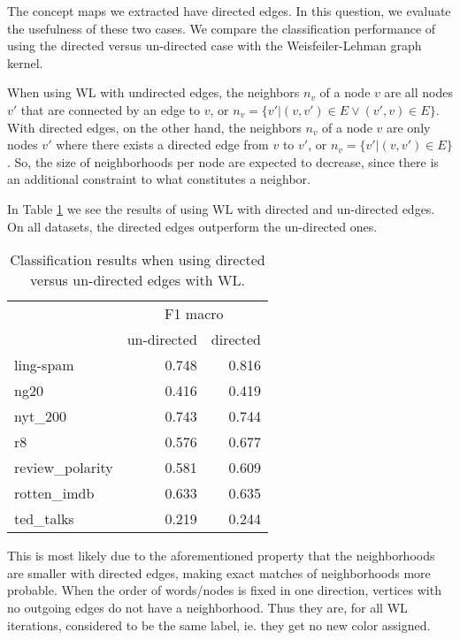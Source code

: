 The concept maps we extracted have directed edges.
In this question, we evaluate the usefulness of these two cases.
We compare the classification performance of using the directed versus un-directed case with the Weisfeiler-Lehman graph kernel.

When using WL with undirected edges, the neighbors $n_v$ of a node $v$ are all nodes $v'$ that are connected by an edge to $v$, or $n_v = \{v' | (v, v') \in E \lor (v', v ) \in E \}$.
With directed edges, on the other hand, the neighbors $n_v$ of a node $v$ are only nodes $v'$ where there exists a directed edge from $v$ to $v'$, or $n_v = \{v' | (v, v') \in E \}$.
So, the size of neighborhoods per node are expected to decrease, since there is an additional constraint to what constitutes a neighbor.

In Table \ref{table:results_directed_vs_undirected} we see the results of using WL with directed and un-directed edges.
On all datasets, the directed edges outperform the un-directed ones.

\begin{table}[htb!]
    \centering
\begin{tabular}{lrr}
\toprule
    &  \multicolumn{2}{c}{F1 macro} \\
     &  un-directed & directed \\
    \midrule
ling-spam       & 0.748 & 0.816 \\
ng20            & 0.416 & 0.419 \\
nyt\_200         & 0.743 & 0.744 \\
r8              & 0.576 & 0.677 \\
review\_polarity & 0.581 & 0.609 \\
rotten\_imdb     & 0.633 & 0.635 \\
ted\_talks       & 0.219 & 0.244 \\
    \bottomrule
\end{tabular}
\caption[Results: WL with directed and un-directed edges]{Classification results when using directed versus un-directed edges with WL.}\label{table:results_directed_vs_undirected}
\end{table}

This is most likely due to the aforementioned property that the neighborhoods are smaller with directed edges, making exact matches of neighborhoods more probable.
When the order of words/nodes is fixed in one direction, vertices with no outgoing edges do not have a neighborhood. Thus they are, for all WL iterations, considered to be the same label, ie. they get no new color assigned.

